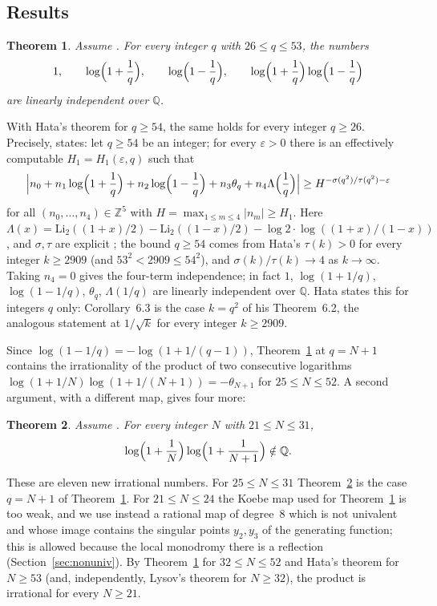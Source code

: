 \documentclass[11pt]{amsart}
\newtheorem{theorem}{Theorem}
\theoremstyle{definition}
\theoremstyle{remark}
\numberwithin{equation}{section}
\newcommand{\ZZ}{\mathbb{Z}}
\newcommand{\QQ}{\mathbb{Q}}
\begin{document}
\subsection{Results}

\begin{theorem}\label{thm:4T}
Assume \cite[Thm.~7.0.1]{CDT}. For every integer $q$ with $26\le q\le53$, the numbers
\[
1,\qquad\log\Bigl(1+\frac1q\Bigr),\qquad\log\Bigl(1-\frac1q\Bigr),\qquad\log\Bigl(1+\frac1q\Bigr)\log\Bigl(1-\frac1q\Bigr)
\]
are linearly independent over $\QQ$.
\end{theorem}

With Hata's theorem \cite{Hat98} for $q\ge54$, the same holds for every integer $q\ge26$. Precisely,
\cite[Cor.~6.3]{Hat98} states: let $q\ge54$ be an integer; for every $\varepsilon>0$ there is an effectively computable
$H_1=H_1(\varepsilon,q)$ such that
\[
\Bigl|n_0+n_1\log\Bigl(1+\frac1q\Bigr)+n_2\log\Bigl(1-\frac1q\Bigr)+n_3\theta_q+n_4\Lambda\Bigl(\frac1q\Bigr)\Bigr|
\ge H^{-\sigma(q^2)/\tau(q^2)-\varepsilon}
\]
for all $(n_0,\dots,n_4)\in\ZZ^5$ with $H=\max_{1\le m\le4}|n_m|\ge H_1$. Here
$\Lambda(x)=\mathrm{Li}_2((1+x)/2)-\mathrm{Li}_2((1-x)/2)-\log2\cdot\log((1+x)/(1-x))$ \cite[(3.5)]{Hat98}, and
$\sigma,\tau$ are explicit \cite[(6.3), (6.4)]{Hat98}; the bound $q\ge54$ comes from Hata's $\tau(k)>0$ for every integer
$k\ge2909$ (and $53^2<2909\le54^2$), and $\sigma(k)/\tau(k)\to4$ as $k\to\infty$. Taking $n_4=0$ gives the four-term independence; in
fact $1$, $\log(1+1/q)$, $\log(1-1/q)$, $\theta_q$, $\Lambda(1/q)$ are linearly independent over $\QQ$. Hata states
this for integers $q$ only: Corollary~6.3 is the case $k=q^2$ of his Theorem~6.2, the analogous statement at
$1/\sqrt k$ for every integer $k\ge2909$.

Since $\log(1-1/q)=-\log(1+1/(q-1))$, Theorem~\ref{thm:4T} at $q=N+1$ contains the irrationality of the product of two
consecutive logarithms $\log(1+1/N)\log(1+1/(N+1))=-\theta_{N+1}$ for $25\le N\le52$. A second argument, with a
different map, gives four more:

\begin{theorem}\label{cor:F1}
Assume \cite[Thm.~7.0.1]{CDT}. For every integer $N$ with $21\le N\le31$,
\[
\log\Bigl(1+\frac1N\Bigr)\log\Bigl(1+\frac1{N+1}\Bigr)\notin\QQ .
\]
\end{theorem}

These are eleven new irrational numbers. For $25\le N\le31$ Theorem~\ref{cor:F1} is the case $q=N+1$ of
Theorem~\ref{thm:4T}. For $21\le N\le24$ the Koebe map used for Theorem~\ref{thm:4T} is too weak, and we use instead a
rational map of degree~$8$ which is not univalent and whose image contains the singular points $y_2,y_3$ of the
generating function; this is allowed because the local monodromy there is a reflection
(Section~\ref{sec:nonuniv}). By Theorem~\ref{thm:4T} for $32\le N\le52$ and Hata's theorem for $N\ge53$ (and,
independently, Lysov's theorem \cite{Lys18} for $N\ge32$), the product is irrational for every $N\ge21$.
\end{document}
